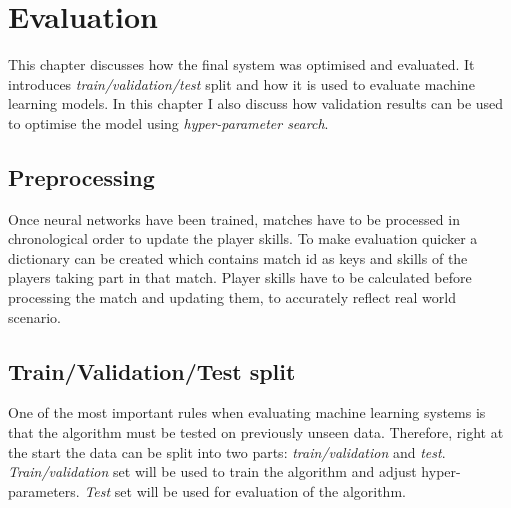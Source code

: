 \documentclass[12pt,a4paper]{book}
\begin{document}
\chapter{Evaluation}
This chapter discusses how the final system was optimised and evaluated.
It introduces \emph{train/validation/test} split and how it is used to evaluate machine learning models.
In this chapter I also discuss how validation results can be used to optimise the model using \emph{hyper-parameter search}.

\section{Preprocessing}
Once neural networks have been trained, matches have to be processed in chronological order to update the player skills.
To make evaluation quicker a dictionary can be created which contains match id as keys and skills of the players taking part in that match.
Player skills have to be calculated before processing the match and updating them, to accurately reflect real world scenario.

\section{Train/Validation/Test split}
One of the most important rules when evaluating machine learning systems is that the algorithm must be tested on previously unseen data.
Therefore, right at the start the data can be split into two parts: \emph{train/validation} and \emph{test}.
\emph{Train/validation} set will be used to train the algorithm and adjust hyper-parameters.
\emph{Test} set will be used for evaluation of the algorithm.
\end{document}
